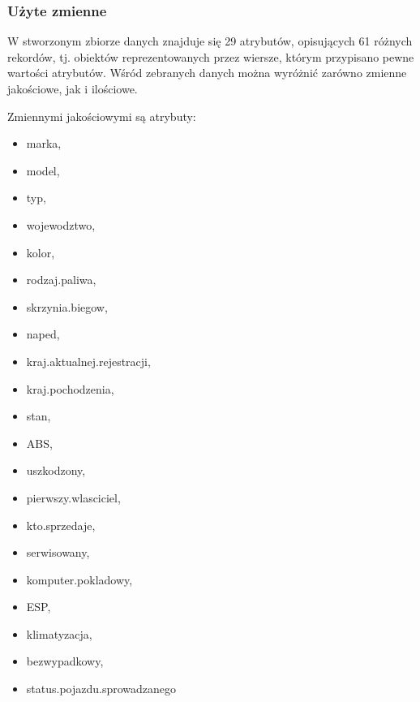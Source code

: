 \documentclass[12pt,a4paper]{report}
\begin{document}
\subsubsection{Użyte zmienne}


W stworzonym zbiorze danych znajduje się 29 atrybutów, opisujących 61 różnych rekordów, tj. obiektów reprezentowanych przez wiersze, którym przypisano pewne wartości atrybutów. Wśród zebranych danych można wyróżnić zarówno zmienne jakościowe, jak i ilościowe. 

Zmiennymi jakościowymi są atrybuty:
\begin{multicols}{3} 
\begin{itemize}
	\item marka,
	\item model,
	\item typ,
	\item wojewodztwo,
	\item kolor,
	\item rodzaj.paliwa,
	\item skrzynia.biegow,
	\item naped,
	\item kraj.aktualnej.rejestracji,%
	\item kraj.pochodzenia,%
	\item stan,
	\item ABS,
	\item uszkodzony,
	\item pierwszy.wlasciciel,%
	\item kto.sprzedaje,%
	\item serwisowany,%
	\item komputer.pokladowy,%
	\item ESP,
	\item klimatyzacja,%
	\item bezwypadkowy,%
	\item status.pojazdu.sprowadzanego%
\end{itemize}
\end{multicols}

%
\end{document}
